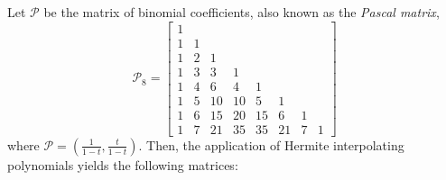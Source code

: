 
\begin{example}
Let $\mathcal{P}$ be the matrix of binomial coefficients, also known as the \textit{Pascal matrix},
\begin{displaymath}
\mathcal{P}_{8}=\left[\begin{matrix}1 &   &   &   &   &   &   &  \\1 & 1 &   &   &   &   &   &  \\1 & 2 & 1 &   &   &   &   &  \\1 & 3 & 3 & 1 &   &   &   &  \\1 & 4 & 6 & 4 & 1 &   &   &  \\1 & 5 & 10 & 10 & 5 & 1 &   &  \\1 & 6 & 15 & 20 & 15 & 6 & 1 &  \\1 & 7 & 21 & 35 & 35 & 21 & 7 & 1\end{matrix}\right]
\end{displaymath}
where $\displaystyle\mathcal{P} = \left(\frac{1}{1-t}, \frac{t}{1-t} \right)$.
Then, the application of Hermite interpolating polynomials yields the following matrices:
\begin{displaymath}

\end{displaymath}
\end{example}
